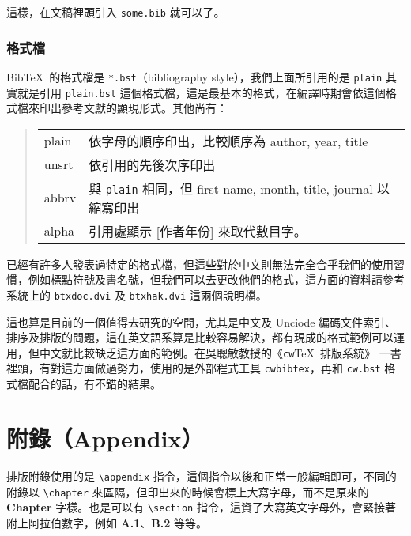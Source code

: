 這樣，在文稿裡頭引入 \texttt{some.bib} 就可以了。

\subsubsection{格式檔}

Bib\TeX\ 的格式檔是 \texttt{*.bst}（bibliography style），我們上面所引用的是 \texttt{plain} 其實就是引用 \texttt{plain.bst} 這個格式檔，這是最基本的格式，在編譯時期會依這個格式檔來印出參考文獻的顯現形式。其他尚有：

\begin{quote}
  \begin{tabular}{>{\ttfamily }ll}
    plain & 依字母的順序印出，比較順序為 author, year, title                        \\
    unsrt & 依引用的先後次序印出                                                    \\
    abbrv & 與 \texttt{plain} 相同，但 first name, month, title, journal 以縮寫印出 \\
    alpha & 引用處顯示 [作者年份] 來取代數目字。
  \end{tabular}
\end{quote}

已經有許多人發表過特定的格式檔，但這些對於中文則無法完全合乎我們的使用習慣，例如標點符號及書名號，但我們可以去更改他們的格式，這方面的資料請參考系統上的 \texttt{btxdoc.dvi} 及 \texttt{btxhak.dvi} 這兩個說明檔。

這也算是目前的一個值得去研究的空間，尤其是中文及 Unciode 編碼文件索引、排序及排版的問題，這在英文語系算是比較容易解決，都有現成的格式範例可以運用，但中文就比較缺乏這方面的範例。在吳聰敏教授的《\texttt{cw}\TeX\ 排版系統》\cite{cwtex} 一書裡頭，有對這方面做過努力，使用的是外部程式工具 \texttt{cwbibtex}，再和 \texttt{cw.bst} 格式檔配合的話，有不錯的結果。

\section{附錄（Appendix）}

排版附錄使用的是 \verb|\appendix| 指令，這個指令以後和正常一般編輯即可，不同的附錄以 \verb|\chapter| 來區隔，但印出來的時候會標上大寫字母，而不是原來的 \textbf{Chapter} 字樣。也是可以有 \verb|\section| 指令，這資了大寫英文字母外，會緊接著附上阿拉伯數字，例如 \textbf{A.1}、\textbf{B.2} 等等。

